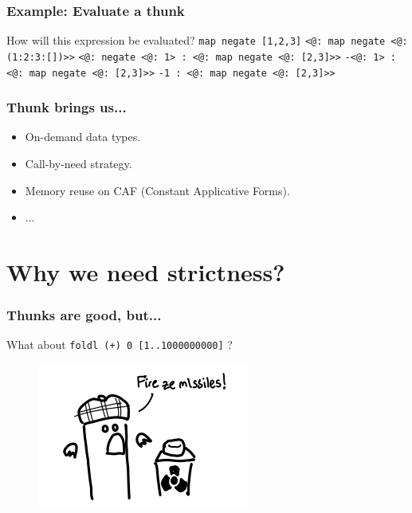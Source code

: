 \documentclass{beamer}
\newcommand{\inlinehaskell}[1]{\texttt{#1}}
\begin{document}

\begin{frame}
\frametitle{Example: Evaluate a thunk}
How will this expression be evaluated?\newline\bigskip
\inlinehaskell{map negate [1,2,3]}\newline\bigskip\pause
\inlinehaskell{<@: map negate <@: (1:2:3:[])>>}\newline\bigskip\pause
\inlinehaskell{<@: negate <@: 1> : <@: map negate <@: [2,3]>>}\newline\bigskip\pause
\inlinehaskell{-<@: 1> : <@: map negate <@: [2,3]>>}\newline\bigskip\pause
\inlinehaskell{-1 : <@: map negate <@: [2,3]>>}
\end{frame}


\begin{frame}
\frametitle{Thunk brings us...}
\begin{itemize}
    \item On-demand data types.
    \item Call-by-need strategy.
    \item Memory reuse on CAF (Constant Applicative Forms).
    \item ...
\end{itemize}\bigskip
{}
\end{frame}


\section{Why we need strictness?}

\begin{frame}
\frametitle{Thunks are good, but...}
\bigskip
What about \inlinehaskell{foldl (+) 0 [1..1000000000]} ?\newline
\begin{figure}[hbt!]
    \centering
    \includegraphics[height=0.4\textheight]{./pic/evil-of-thunk.png}
\end{figure}
\end{frame}
\end{document}
